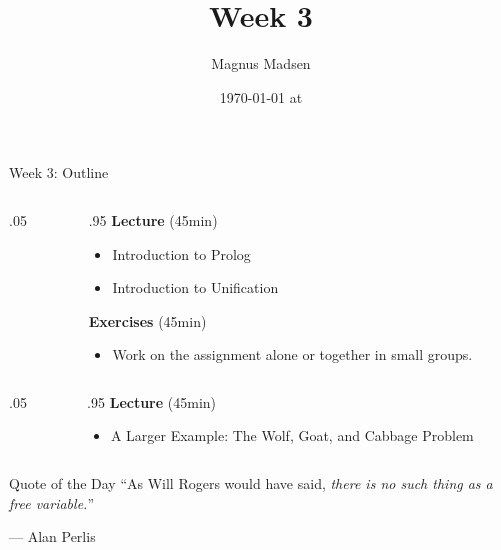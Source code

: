 

\title{Week 3}
\date{\today{} at \currenttime{}}
\author{Magnus Madsen}



\maketitle

\begin{frame}{Week 3: Outline}
\begin{columns}
\begin{column}{.05\textwidth}
\end{column}
\begin{column}{.95\textwidth}
    \footnotesize
\textbf{Lecture} (45min)  \vspace{-2mm}
\begin{itemize}
    \setlength\itemsep{-0.5em}
    \item Introduction to Prolog
    \item Introduction to Unification
\end{itemize}
\textbf{Exercises} (45min) \vspace{-2mm}
\begin{itemize}
    \item Work on the assignment alone or together in small groups.
\end{itemize}
\end{column}
\end{columns}

\medskip
\medskip
\medskip

\begin{columns}
\color{gray}
\begin{column}{.05\textwidth}
\end{column}
\begin{column}{.95\textwidth}
\footnotesize
\textbf{Lecture} (45min) \vspace{-2mm}
\begin{itemize}
    \color{gray}
    \setlength\itemsep{-0.5em}
    \item A Larger Example: The Wolf, Goat, and Cabbage Problem
\end{itemize}
\end{column}
\end{columns}
\end{frame}

\begin{frame}{Quote of the Day}
``As Will Rogers would have said, \emph{there is no such thing as a free variable.}''

\begin{flushright}
--- Alan Perlis
\end{flushright}
\end{frame}

